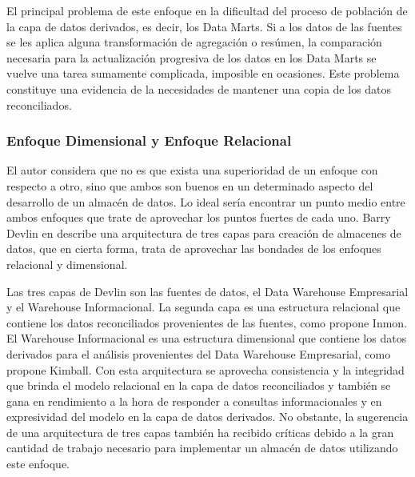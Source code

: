 El principal problema de este enfoque en la dificultad del proceso de poblaci\'on de la capa de datos derivados, es decir, los 
Data Marts. Si a  los datos de las fuentes se les aplica alguna transformaci\'on de agregaci\'on o res\'umen, la comparaci\'on 
necesaria para la actualización progresiva de los datos en los Data Marts se vuelve una tarea sumamente complicada, imposible en 
ocasiones. Este problema constituye una evidencia de la necesidades de mantener una copia de los datos reconciliados\cite{mijailmaster}.

\subsubsection{Enfoque Dimensional y Enfoque Relacional}

El autor considera que no es que exista una superioridad de un enfoque con respecto a otro, sino que ambos son buenos en 
un determinado aspecto del desarrollo de un almac\'en de datos. Lo ideal ser\'ia encontrar un punto medio entre ambos 
enfoques que trate de aprovechar los puntos fuertes de cada uno. Barry Devlin en \cite{devlin1996data} describe 
una arquitectura de tres capas para creaci\'on de almacenes de datos, que en cierta forma, trata de aprovechar las 
bondades de los enfoques relacional y dimensional. 

Las tres capas de Devlin son las fuentes de datos, el Data Warehouse Empresarial y el Warehouse Informacional. La segunda capa 
es una estructura relacional que contiene los datos reconciliados provenientes de las fuentes, como propone Inmon. El Warehouse 
Informacional es una estructura dimensional que contiene los datos derivados para el an\'alisis provenientes del Data Warehouse 
Empresarial, como propone Kimball. Con esta arquitectura se aprovecha consistencia y la integridad que brinda el modelo relacional 
en la capa de datos reconciliados y tambi\'en se gana en rendimiento a la hora de responder a consultas informacionales y en expresividad 
del modelo en la capa de datos derivados. No obstante, la sugerencia de una arquitectura de tres capas también ha recibido críticas 
debido a la gran cantidad de trabajo necesario para implementar un almacén de datos utilizando este enfoque. 
